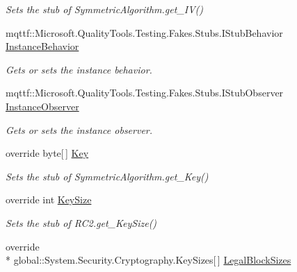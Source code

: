 \begin{DoxyCompactItemize}
\begin{DoxyCompactList}\small\item\em Sets the stub of Symmetric\-Algorithm.\-get\-\_\-\-I\-V()\end{DoxyCompactList}\item 
mqttf\-::\-Microsoft.\-Quality\-Tools.\-Testing.\-Fakes.\-Stubs.\-I\-Stub\-Behavior \hyperlink{class_system_1_1_security_1_1_cryptography_1_1_fakes_1_1_stub_r_c2_a61b6c4bc2fb3d1b5a58af58d7d4dea51}{Instance\-Behavior}
\begin{DoxyCompactList}\small\item\em Gets or sets the instance behavior.\end{DoxyCompactList}\item 
mqttf\-::\-Microsoft.\-Quality\-Tools.\-Testing.\-Fakes.\-Stubs.\-I\-Stub\-Observer \hyperlink{class_system_1_1_security_1_1_cryptography_1_1_fakes_1_1_stub_r_c2_a99b1bd0841640432ff8fdc794bbcfcde}{Instance\-Observer}
\begin{DoxyCompactList}\small\item\em Gets or sets the instance observer.\end{DoxyCompactList}\item 
override byte\mbox{[}$\,$\mbox{]} \hyperlink{class_system_1_1_security_1_1_cryptography_1_1_fakes_1_1_stub_r_c2_a4fb8931cb0c21038d2e80071ec83cbfa}{Key}
\begin{DoxyCompactList}\small\item\em Sets the stub of Symmetric\-Algorithm.\-get\-\_\-\-Key()\end{DoxyCompactList}\item 
override int \hyperlink{class_system_1_1_security_1_1_cryptography_1_1_fakes_1_1_stub_r_c2_afe0f1538cec6d56c4ea245d165e41f4b}{Key\-Size}
\begin{DoxyCompactList}\small\item\em Sets the stub of R\-C2.\-get\-\_\-\-Key\-Size()\end{DoxyCompactList}\item 
override \\*
global\-::\-System.\-Security.\-Cryptography.\-Key\-Sizes\mbox{[}$\,$\mbox{]} \hyperlink{class_system_1_1_security_1_1_cryptography_1_1_fakes_1_1_stub_r_c2_a73bd00eee152b8fa712a8b9162f329a4}{Legal\-Block\-Sizes}

\end{DoxyCompactItemize}
